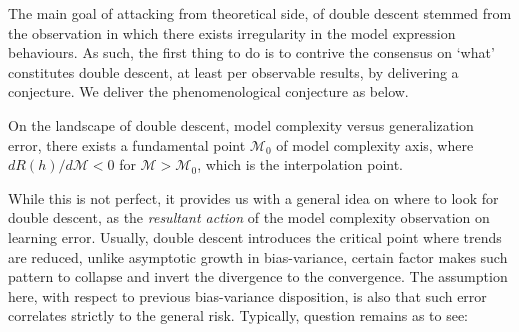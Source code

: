 The main goal of attacking from theoretical side, of double descent stemmed from the observation in which there exists irregularity in the model expression behaviours. As such, the first thing to do is to contrive the consensus on `what' constitutes double descent, at least per observable results, by delivering a conjecture. We deliver the phenomenological conjecture as below. 

\begin{conjecture}
    On the landscape of double descent, model complexity versus generalization error, there exists a fundamental point $\mathcal{M}_{0}$ of model complexity axis, where $dR(h)/d\mathcal{M}< 0$ for $\mathcal{M}> \mathcal{M}_{0}$, which is the interpolation point. 
\end{conjecture}

While this is not perfect, it provides us with a general idea on where to look for double descent, as the \textit{resultant action} of the model complexity observation on learning error. Usually, double descent introduces the critical point where trends are reduced, unlike asymptotic growth in bias-variance, certain factor makes such pattern to collapse and invert the divergence to the convergence. The assumption here, with respect to previous bias-variance disposition, is also that such error correlates strictly to the general risk. Typically, question remains as to see: 

